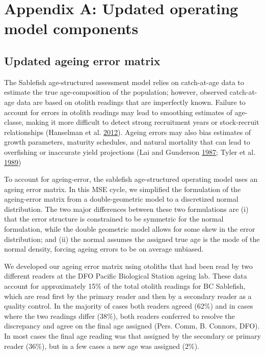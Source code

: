 \documentclass[11pt]{book}
\begin{document}
\MakeFirstPage

\hypertarget{appendix-appendices}{%
\appendix}


\hypertarget{appendix-a-updated-operating-model-components}{%
\section{Appendix A: Updated operating model components}\label{appendix-a-updated-operating-model-components}}

\setcounter{table}{0}\setcounter{figure}{0}

\hypertarget{updated-ageing-error-matrix}{%
\subsection{Updated ageing error matrix}\label{updated-ageing-error-matrix}}

The Sablefish age-structured assessment model relies on catch-at-age data to estimate the true age-composition of the population; however, observed catch-at-age data are based on otolith readings that are imperfectly known. Failure to account for errors in otolith readings may lead to smoothing estimates of age-classe, making it more difficult to detect strong recruitment years or stock-recruit relationships (Hanselman et al. \protect\hyperlink{ref-hanselman2012statistical}{2012}). Ageing errors may also bias estimates of growth parameters, maturity schedules, and natural mortality that can lead to overfishing or inaccurate yield projections (Lai and Gunderson \protect\hyperlink{ref-lai1987effects}{1987}; Tyler et al. \protect\hyperlink{ref-tyler1989implications}{1989})

To account for ageing-error, the sablefish age-structured operating model uses an ageing error matrix. In this MSE cycle, we simplified the formulation of the ageing-error matrix from a double-geometric model to a discretized normal distribution. The two major differences between these two formulations are (i) that the error structure is constrained to be symmetric for the normal formulation, while the double geometric model allows for some skew in the error distribution; and (ii) the normal assumes the assigned true age is the mode of the normal density, forcing ageing errors to be on average unbiased.

We developed our ageing error matrix using otoliths that had been read by two different readers at the DFO Pacific Biological Station ageing lab. These data account for approximately 15\% of the total otolith readings for BC Sablefish, which are read first by the primary reader and then by a secondary reader as a quality control. In the majority of cases both readers agreed (62\%) and in cases where the two readings differ (38\%), both readers conferred to resolve the discrepancy and agree on the final age assigned (Pers. Comm, B. Connors, DFO). In most cases the final age reading was that assigned by the secondary or primary reader (36\%), but in a few cases a new age was assigned (2\%).
\end{document}
